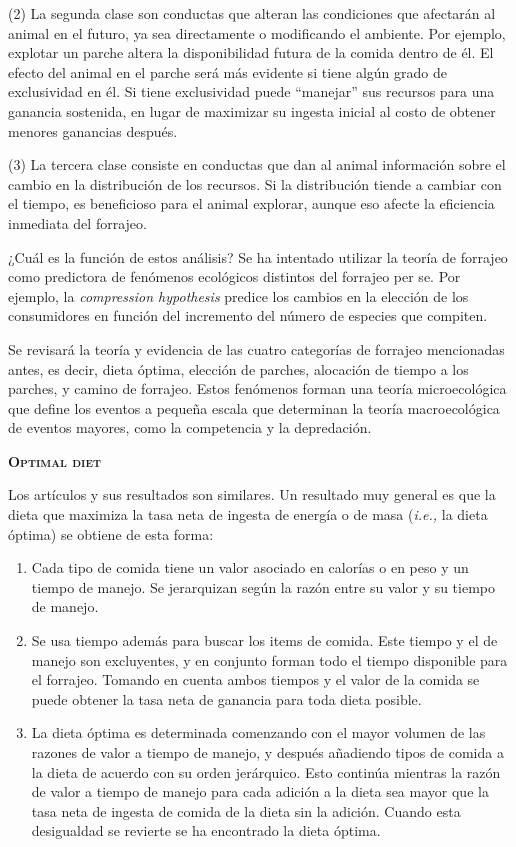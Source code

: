 \documentclass[a4paper,12pt]{article}
\begin{document}
(2) La segunda clase son conductas que alteran las condiciones que afectarán al animal en el futuro, ya sea directamente o modificando el ambiente. Por ejemplo, explotar un parche altera la disponibilidad futura de la comida dentro de él. El efecto del animal en el parche será más evidente si tiene algún grado de exclusividad en él. Si tiene exclusividad puede ``manejar'' sus recursos para una ganancia sostenida, en lugar de maximizar su ingesta inicial al costo de obtener menores ganancias después.

(3) La tercera clase consiste en conductas que dan al animal información sobre el cambio en la distribución de los recursos. Si la distribución tiende a cambiar con el tiempo, es beneficioso para el animal explorar, aunque eso afecte la eficiencia inmediata del forrajeo.

¿Cuál es la función de estos análisis? Se ha intentado utilizar la teoría de forrajeo como predictora de fenómenos ecológicos distintos del forrajeo per se. Por ejemplo, la {\itshape compression hypothesis} predice los cambios en la elección de los consumidores en función del incremento del número de especies que compiten.

Se revisará la teoría y evidencia de las cuatro categorías de forrajeo mencionadas antes, es decir, dieta óptima, elección de parches, alocación de tiempo a los parches, y camino de forrajeo. Estos fenómenos forman una teoría microecológica que define los eventos a pequeña escala que determinan la teoría macroecológica de eventos mayores, como la competencia y la depredación.

{\scshape\bfseries Optimal diet}

Los artículos y sus resultados son similares. Un resultado muy general es que la dieta que maximiza la tasa neta de ingesta de energía o de masa ({\itshape i.e.,} la dieta óptima) se obtiene de esta forma:
\begin{enumerate}
	\item Cada tipo de comida tiene un valor asociado en calorías o en peso y un tiempo de manejo. Se jerarquizan según la razón entre su valor y su tiempo de manejo.
	\item Se usa tiempo además para buscar los items de comida. Este tiempo y el de manejo son excluyentes, y en conjunto forman todo el tiempo disponible para el forrajeo. Tomando en cuenta ambos tiempos y el valor de la comida se puede obtener la tasa neta de ganancia para toda dieta posible.
	\item La dieta óptima es determinada comenzando con el mayor volumen de las razones de valor a tiempo de manejo, y después añadiendo tipos de comida a la dieta de acuerdo con su orden jerárquico. Esto continúa mientras la razón de valor a tiempo de manejo para cada adición a la dieta sea mayor que la tasa neta de ingesta de comida de la dieta sin la adición. Cuando esta desigualdad se revierte se ha encontrado la dieta óptima.
\end{enumerate}
\end{document}
